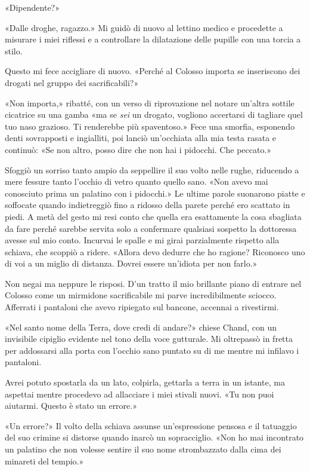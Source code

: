 «Dipendente?»

«Dalle droghe, ragazzo.» Mi guidò di nuovo al lettino medico e
procedette a misurare i miei riflessi e a controllare la dilatazione
delle pupille con una torcia a stilo.

Questo mi fece accigliare di nuovo. «Perché al Colosso importa se
inseriscono dei drogati nel gruppo dei sacrificabili?»

«Non importa,» ribatté, con un verso di riprovazione nel notare un'altra
sottile cicatrice su una gamba «ma se \emph{sei} un drogato, vogliono
accertarsi di tagliare quel tuo naso grazioso. Ti renderebbe più
spaventoso.» Fece una smorfia, esponendo denti sovrapposti e ingialliti,
poi lanciò un'occhiata alla mia testa rasata e continuò: «Se non altro,
posso dire che non hai i pidocchi. Che peccato.»

Sfoggiò un sorriso tanto ampio da seppellire il suo volto nelle rughe,
riducendo a mere fessure tanto l'occhio di vetro quanto quello sano.
«Non avevo mai conosciuto prima un palatino con i pidocchi.» Le ultime
parole suonarono piatte e soffocate quando indietreggiò fino a ridosso
della parete perché ero scattato in piedi. A metà del gesto mi resi
conto che quella era esattamente la cosa sbagliata da fare perché
sarebbe servita solo a confermare qualsiasi sospetto la dottoressa
avesse sul mio conto. Incurvai le spalle e mi girai parzialmente
rispetto alla schiava, che scoppiò a ridere. «Allora devo dedurre che ho
ragione? Riconosco uno di voi a un miglio di distanza. Dovrei essere
un'idiota per non farlo.»

Non negai ma neppure le risposi. D'un tratto il mio brillante piano di
entrare nel Colosso come un mirmidone sacrificabile mi parve
incredibilmente sciocco. Afferrati i pantaloni che avevo ripiegato sul
bancone, accennai a rivestirmi.

«Nel santo nome della Terra, dove credi di andare?» chiese Chand, con un
invisibile cipiglio evidente nel tono della voce gutturale. Mi
oltrepassò in fretta per addossarsi alla porta con l'occhio sano puntato
su di me mentre mi infilavo i pantaloni.

Avrei potuto spostarla da un lato, colpirla, gettarla a terra in un
istante, ma aspettai mentre procedevo ad allacciare i miei stivali
nuovi. «Tu non puoi aiutarmi. Questo è stato un errore.»

«Un errore?» Il volto della schiava assunse un'espressione pensosa e il
tatuaggio del suo crimine si distorse quando inarcò un sopracciglio.
«Non ho mai incontrato un palatino che non volesse sentire il suo nome
strombazzato dalla cima dei minareti del tempio.»


